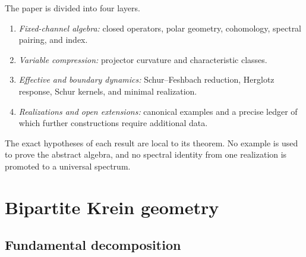 \documentclass[11pt,reqno]{scrartcl}
\theoremstyle{plain}
\theoremstyle{definition}
\theoremstyle{remark}
\begin{document}
The paper is divided into four layers.
\begin{enumerate}[label=(\roman*)]
  \item \emph{Fixed-channel algebra:} closed operators, polar geometry,
  cohomology, spectral pairing, and index.
  \item \emph{Variable compression:} projector curvature and
  characteristic classes.
  \item \emph{Effective and boundary dynamics:} Schur--Feshbach reduction,
  Herglotz response, Schur kernels, and minimal realization.
  \item \emph{Realizations and open extensions:} canonical examples and a
  precise ledger of which further constructions require additional data.
\end{enumerate}
The exact hypotheses of each result are local to its theorem.  No example is
used to prove the abstract algebra, and no spectral identity from one
realization is promoted to a universal spectrum.


\section{Bipartite Krein geometry}
\label{sec:setup}

\subsection{Fundamental decomposition}
\end{document}
